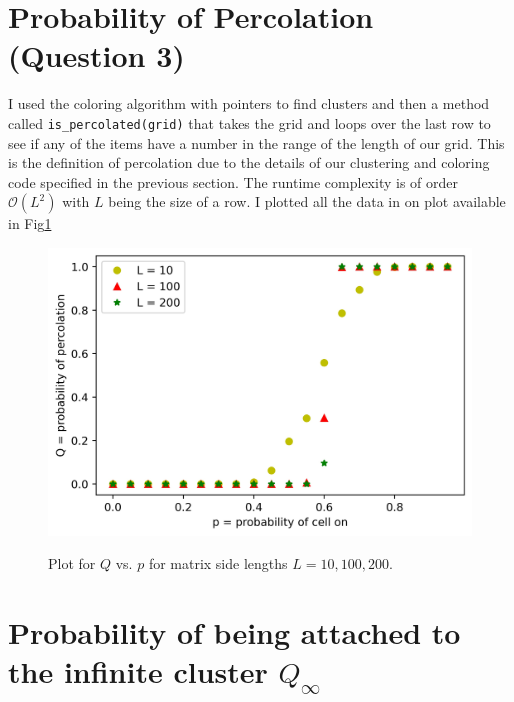 \documentclass[12pt]{article}
\begin{document}
	\section{Probability of Percolation (Question 3)}
	I used the coloring algorithm with pointers to find clusters and then a method called \texttt{is\_percolated(grid)} that takes the grid and loops over the last
	row to see if any of the items have a number in the range of the length of our grid. This is the definition of percolation due to the details of
	our clustering and coloring code specified in the previous section. The runtime complexity is of order $\mathcal{O}(L^2)$ with $L$ being the 
	size of a row.
	I plotted all the data in on plot available in Fig\ref{fig:Perc}
	\begin{figure}[h!]
		\centering
		\includegraphics[width=0.9\linewidth]{../p3/percs.jpg}
		\label{fig:Perc}
		\caption{Plot for $Q$ vs. $p$ for matrix side lengths $L = 10, 100, 200$.}
	\end{figure}
	
	\section{Probability of being attached to the infinite cluster $Q_\infty$}
	
\end{document}
